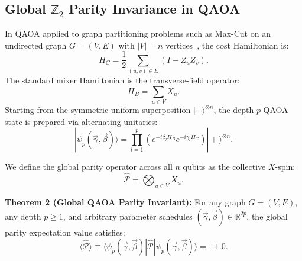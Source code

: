 \documentclass[aps,pra,reprint,superscriptaddress,floatfix,nofootinbib]{revtex4-2}
\begin{document}
\subsection{Global \texorpdfstring{$\mathbb{Z}_2$}{Z2} Parity Invariance in QAOA}
In QAOA applied to graph partitioning problems such as Max-Cut on an undirected graph $G = (V, E)$ with $|V| = n$ vertices~\cite{Farhi2014, Hadfield2019, Zhou2020, Bapat2019}, the cost Hamiltonian is:
\begin{equation}
H_C = \frac{1}{2} \sum_{(u, v) \in E} (I - Z_u Z_v).
\end{equation}
The standard mixer Hamiltonian is the transverse-field operator:
\begin{equation}
H_B = \sum_{u \in V} X_u.
\end{equation}
Starting from the symmetric uniform superposition $|+\rangle^{\otimes n}$, the depth-$p$ QAOA state is prepared via alternating unitaries:
\begin{equation}
|\psi_p(\vec{\gamma}, \vec{\beta})\rangle = \prod_{l=1}^p \left( e^{-i \beta_l H_B} e^{-i \gamma_l H_C} \right) |+\rangle^{\otimes n}.
\end{equation}

We define the global parity operator across all $n$ qubits as the collective $X$-spin:
\begin{equation}
\hat{\mathcal{P}} = \bigotimes_{u \in V} X_u.
\label{eq:parity_op}
\end{equation}

\textbf{Theorem 2 (Global QAOA Parity Invariant):} 
For any graph $G = (V, E)$, any depth $p \ge 1$, and arbitrary parameter schedules $(\vec{\gamma}, \vec{\beta}) \in \mathbb{R}^{2p}$, the global parity expectation value satisfies:
\begin{equation}
\langle \hat{\mathcal{P}} \rangle \equiv \langle \psi_p(\vec{\gamma}, \vec{\beta}) | \hat{\mathcal{P}} | \psi_p(\vec{\gamma}, \vec{\beta}) \rangle = +1.0.
\label{eq:qaoa_invariant}
\end{equation}
\end{document}
